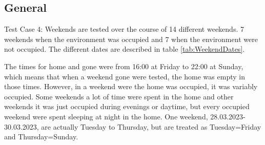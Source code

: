 \subsection{General}
Test Case 4: Weekends are tested over the course of 14 different weekends. 7 weekends when the environment was occupied and 7 when the environment were not occupied. The different dates are described in table \ref{tab:WeekendDates}. 
\begin{table}[H]
    \centering
    \caption{Dates for Test Case 4: Weekends}
    \label{tab:WeekendDates}
\end{table}

The times for home and gone were from 16:00 at Friday to 22:00 at Sunday, which means that when a weekend gone were tested, the home was empty in those times. However, in a weekend were the home was occupied, it was variably occupied. Some weekends a lot of time were spent in the home and other weekends it was just occupied during evenings or daytime, but every occupied weekend were spent sleeping at night in the home. One weekend, 28.03.2023-30.03.2023, are actually Tuesday to Thursday, but are treated as Tuesday=Friday and Thursday=Sunday. 
\newpage
